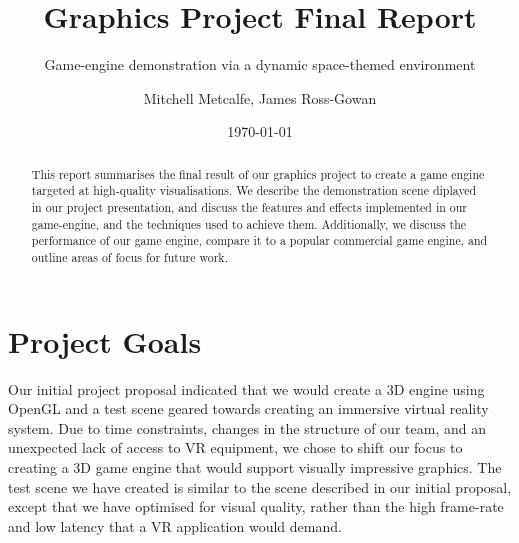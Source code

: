 \documentclass[11pt]{scrartcl} %
\title{Graphics Project Final Report}
\subtitle{Game-engine demonstration via a dynamic space-themed environment}
\author{ Mitchell Metcalfe, James Ross-Gowan }
\date{\today} %
\begin{document}
\maketitle

\begin{abstract}


    This report summarises the final result of our graphics project to create a
    game engine targeted at high-quality visualisations.  We describe the
    demonstration scene diplayed in our project presentation, and discuss the
    features and effects implemented in our game-engine, and the techniques
    used to achieve them. Additionally, we discuss the performance of our game
    engine, compare it to a popular commercial game engine, and outline areas
    of focus for future work.

\end{abstract}

\newpage

\tableofcontents

\newpage


\section{Project Goals}

    Our initial project proposal indicated that we would create a 3D engine
    using OpenGL and a test scene geared towards creating an immersive virtual
    reality system. Due to time constraints, changes in the structure of our
    team, and an unexpected lack of access to VR equipment, we chose to shift
    our focus to creating a 3D game engine that would support visually
    impressive graphics. The test scene we have created is similar to the scene
    described in our initial proposal, except that we have optimised for visual
    quality, rather than the high frame-rate and low latency that a VR
    application would demand.
\end{document}

